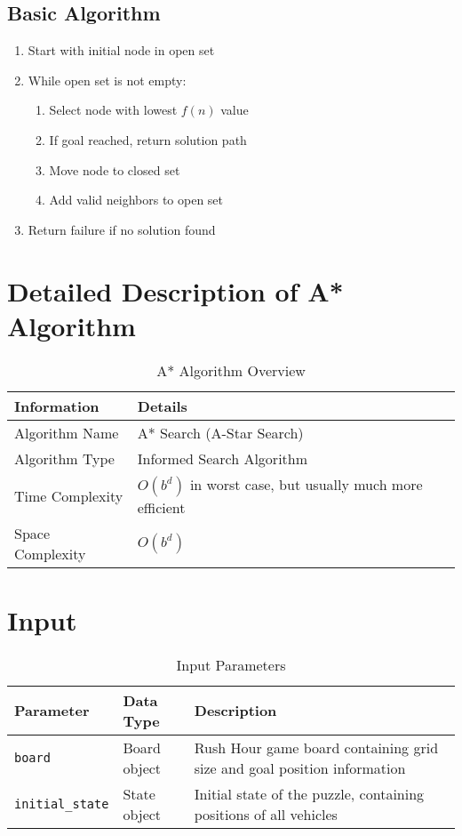 \documentclass[12pt,a4paper]{article}
\begin{document}
\subsection{Basic Algorithm}

\begin{enumerate}
    \item Start with initial node in open set
    \item While open set is not empty:
    \begin{enumerate}
        \item Select node with lowest $f(n)$ value
        \item If goal reached, return solution path
        \item Move node to closed set
        \item Add valid neighbors to open set
    \end{enumerate}
    \item Return failure if no solution found
\end{enumerate}

\section{Detailed Description of A* Algorithm}

\begin{table}[h!]
\centering
\begin{tabular}{|l|l|}
\hline
\textbf{Information} & \textbf{Details} \\
\hline
Algorithm Name & A* Search (A-Star Search) \\
\hline
Algorithm Type & Informed Search Algorithm \\
\hline
Time Complexity & $O(b^d)$ in worst case, but usually much more efficient \\
\hline
Space Complexity & $O(b^d)$ \\
\hline
\end{tabular}
\caption{A* Algorithm Overview}
\end{table}

\section{Input}

\begin{table}[h!]
\centering
\begin{tabular}{|l|l|p{6cm}|}
\hline
\textbf{Parameter} & \textbf{Data Type} & \textbf{Description} \\
\hline
\texttt{board} & Board object & Rush Hour game board containing grid size and goal position information \\
\hline
\texttt{initial\_state} & State object & Initial state of the puzzle, containing positions of all vehicles \\
\hline
\end{tabular}
\caption{Input Parameters}
\end{table}
\end{document}
